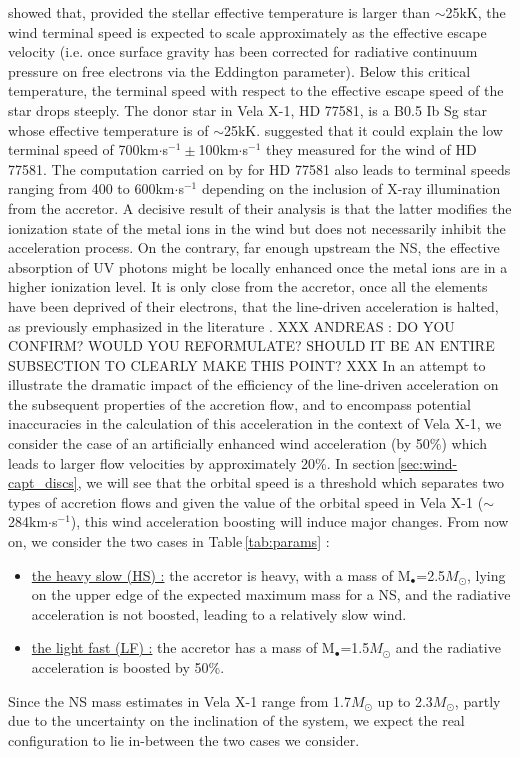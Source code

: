 \documentclass{aa}
\makeatletter
\newcommand*{\ns}{NS\@\xspace}
\newcommand*{\eg}{e.g.\@\xspace}
\newcommand*{\ie}{i.e.\@\xspace}
\newcommand*{\msun}{$M_{\odot}$\@\xspace}
\makeatother
\begin{document}
\cite{Vink2001} showed that, provided the stellar effective temperature is larger than $\sim$25kK, the wind terminal speed is expected to scale approximately as the effective escape velocity (\ie once surface gravity has been corrected for radiative continuum pressure on free electrons via the Eddington parameter). Below this critical temperature, the terminal speed with respect to the effective escape speed of the star drops steeply. The donor star in Vela X-1, HD
77581, is a B0.5 Ib Sg star \citep{Hiltner1972,Forman1973} whose effective temperature is of $\sim$25kK. \cite{Gimenez-Garcia2016} suggested that it could explain the low terminal speed of 700km$\cdot$s$^{-1}\pm$100km$\cdot$s$^{-1}$ they measured for the wind of HD 77581. The computation carried on by \cite{Sander2017} for HD 77581 also leads to terminal speeds ranging from 400 to 600km$\cdot$s$^{-1}$ depending on the inclusion of X-ray illumination from the accretor. A decisive result of their analysis is that the latter modifies the ionization state of the metal ions in the wind but does not necessarily inhibit the acceleration process. On the contrary, far enough upstream the \ns, the effective absorption of UV photons might be locally enhanced once the metal ions are in a higher ionization level. It is only close from the accretor, once all the elements have been deprived of their electrons, that the line-driven acceleration is halted, as previously emphasized in the literature \citep[see \eg][]{Hatchett1977,Ho1987,Blondin1990a,Karino2014}. XXX ANDREAS : DO YOU CONFIRM? WOULD YOU REFORMULATE? SHOULD IT BE AN ENTIRE SUBSECTION TO CLEARLY MAKE THIS POINT? XXX In an attempt to illustrate the dramatic impact of the efficiency of the line-driven acceleration on the subsequent properties of the accretion flow, and to encompass potential inaccuracies in the calculation of this acceleration in the context of Vela X-1, we consider the case of an artificially enhanced wind acceleration (by 50\%) which leads to larger flow velocities by approximately 20\%. In section\,\ref{sec:wind-capt_discs}, we will see that the orbital speed is a threshold which separates two types of accretion flows and given the value of the orbital speed in Vela X-1 ($\sim$284km$\cdot$s$^{-1}$), this wind acceleration boosting will induce major changes. From now on, we consider the two cases in Table\,\ref{tab:params} :
\begin{itemize}
\item \underline{the heavy slow (HS) :} the accretor is heavy, with a mass of M$_{\bullet}$=2.5\msun, lying on the upper edge of the expected maximum mass for a \ns, and the radiative acceleration is not boosted, leading to a relatively slow wind.
\item  \underline{the light fast (LF) :} the accretor has a mass of M$_{\bullet}$=1.5\msun and the radiative acceleration is boosted by 50\%.
\end{itemize} 
Since the \ns mass estimates in Vela X-1 range from 1.7\msun \citep{Rawls2011} up to 2.3\msun \citep{Quaintrell2003a}, partly due to the uncertainty on the inclination of the system, we expect the real configuration to lie in-between the two cases we consider.
\end{document}
